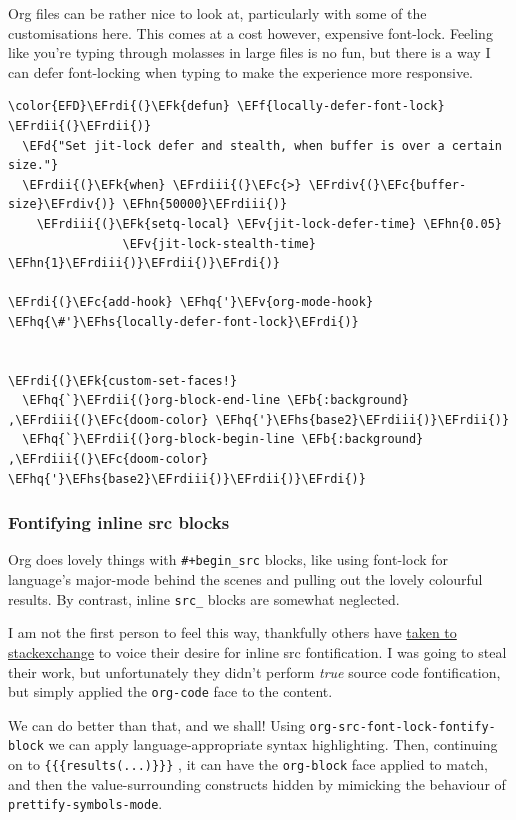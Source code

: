 \documentclass{scrartcl}
\newcommand{\EFk}[1]{\textcolor{EFk}{#1}} %
\newcommand{\EFd}[1]{\textcolor{EFd}{\textit{#1}}} %
\newcommand{\EFb}[1]{\textcolor{EFb}{#1}} %
\newcommand{\EFc}[1]{\textcolor{EFc}{#1}} %
\newcommand{\EFv}[1]{\textcolor{EFv}{#1}} %
\newcommand{\EFf}[1]{\textcolor{EFf}{#1}} %
\newcommand{\EFhn}[1]{\textcolor{EFhn}{\textbf{#1}}} %
\newcommand{\EFhq}[1]{\textcolor{EFhq}{#1}} %
\newcommand{\EFhs}[1]{\textcolor{EFhs}{#1}} %
\newcommand{\EFrdi}[1]{\textcolor{EFrdi}{#1}} %
\newcommand{\EFrdii}[1]{\textcolor{EFrdii}{#1}} %
\newcommand{\EFrdiii}[1]{\textcolor{EFrdiii}{#1}} %
\newcommand{\EFrdiv}[1]{\textcolor{EFrdiv}{#1}} %
\begin{document}
Org files can be rather nice to look at, particularly with some of the
customisations here. This comes at a cost however, expensive font-lock.
Feeling like you're typing through molasses in large files is no fun, but there
is a way I can defer font-locking when typing to make the experience more
responsive.
\begin{Code}
\begin{Verbatim}[]
\color{EFD}\EFrdi{(}\EFk{defun} \EFf{locally-defer-font-lock} \EFrdii{(}\EFrdii{)}
  \EFd{"Set jit-lock defer and stealth, when buffer is over a certain size."}
  \EFrdii{(}\EFk{when} \EFrdiii{(}\EFc{>} \EFrdiv{(}\EFc{buffer-size}\EFrdiv{)} \EFhn{50000}\EFrdiii{)}
    \EFrdiii{(}\EFk{setq-local} \EFv{jit-lock-defer-time} \EFhn{0.05}
                \EFv{jit-lock-stealth-time} \EFhn{1}\EFrdiii{)}\EFrdii{)}\EFrdi{)}

\EFrdi{(}\EFc{add-hook} \EFhq{'}\EFv{org-mode-hook} \EFhq{\#'}\EFhs{locally-defer-font-lock}\EFrdi{)}


\EFrdi{(}\EFk{custom-set-faces!}
  \EFhq{`}\EFrdii{(}org-block-end-line \EFb{:background} ,\EFrdiii{(}\EFc{doom-color} \EFhq{'}\EFhs{base2}\EFrdiii{)}\EFrdii{)}
  \EFhq{`}\EFrdii{(}org-block-begin-line \EFb{:background} ,\EFrdiii{(}\EFc{doom-color} \EFhq{'}\EFhs{base2}\EFrdiii{)}\EFrdii{)}\EFrdi{)}
\end{Verbatim}
\end{Code}

\subsubsection{Fontifying inline src blocks}
\label{sec:org23e859f}
Org does lovely things with \texttt{\#+begin\_src} blocks, like using font-lock for
language's major-mode behind the scenes and pulling out the lovely colourful
results. By contrast, inline \texttt{src\_} blocks are somewhat neglected.

I am not the first person to feel this way, thankfully others have \href{https://stackoverflow.com/questions/20309842/how-to-syntax-highlight-for-org-mode-inline-source-code-src-lang/28059832}{taken to
stackexchange} to voice their desire for inline src fontification. I was going to
steal their work, but unfortunately they didn't perform \emph{true} source code
fontification, but simply applied the \texttt{org-code} face to the content.

We can do better than that, and we shall! Using \texttt{org-src-font-lock-fontify-block}
we can apply language-appropriate syntax highlighting. Then, continuing on to
\texttt{\{\{\{results(...)\}\}\}} , it can have the \texttt{org-block} face applied to match, and then
the value-surrounding constructs hidden by mimicking the behaviour of
\texttt{prettify-symbols-mode}.
\end{document}
